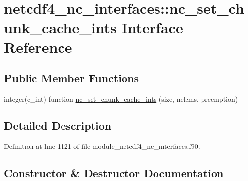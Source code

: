 \hypertarget{interfacenetcdf4__nc__interfaces_1_1nc__set__chunk__cache__ints}{}\section{netcdf4\+\_\+nc\+\_\+interfaces\+:\+:nc\+\_\+set\+\_\+chunk\+\_\+cache\+\_\+ints Interface Reference}
\label{interfacenetcdf4__nc__interfaces_1_1nc__set__chunk__cache__ints}
\subsection*{Public Member Functions}
\begin{DoxyCompactItemize}
\item 
integer(c\+\_\+int) function \hyperlink{interfacenetcdf4__nc__interfaces_1_1nc__set__chunk__cache__ints_ae377f88ee64758e7e7f51bfeb3c998cc}{nc\+\_\+set\+\_\+chunk\+\_\+cache\+\_\+ints} (size, nelems, preemption)
\end{DoxyCompactItemize}


\subsection{Detailed Description}


Definition at line 1121 of file module\+\_\+netcdf4\+\_\+nc\+\_\+interfaces.\+f90.



\subsection{Constructor \& Destructor Documentation}
\mbox{\label{interfacenetcdf4__nc__interfaces_1_1nc__set__chunk__cache__ints_ae377f88ee64758e7e7f51bfeb3c998cc}} 

